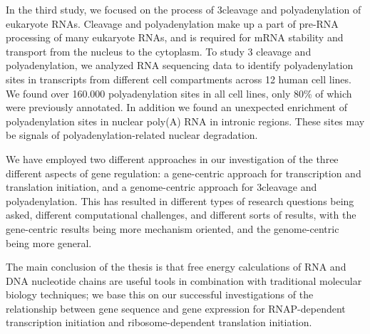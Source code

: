 In the third study, we focused on the process of 3\ppp cleavage and
polyadenylation of eukaryote RNAs. Cleavage and polyadenylation make up a part
of pre-RNA processing of many eukaryote RNAs, and is required for mRNA
stability and transport from the nucleus to the cytoplasm. To study 3\ppp
cleavage and polyadenylation, we analyzed RNA sequencing data to identify
polyadenylation sites in transcripts from different cell compartments across 12
human cell lines. We found over 160.000 polyadenylation sites in all cell
lines, only 80\% of which were previously annotated. In addition we found an
unexpected enrichment of polyadenylation sites in nuclear poly(A) RNA in
intronic regions. These sites may be signals of polyadenylation-related nuclear
degradation.

We have employed two different approaches in our investigation of the three
different aspects of gene regulation: a gene-centric approach for transcription
and translation initiation, and a genome-centric approach for 3\ppp cleavage
and polyadenylation. This has resulted in different types of research questions
being asked, different computational challenges, and different sorts of
results, with the gene-centric results being more mechanism oriented, and the
genome-centric being more general.

The main conclusion of the thesis is that free energy calculations of RNA and
DNA nucleotide chains are useful tools in combination with traditional
molecular biology techniques; we base this on our successful investigations of
the relationship between gene sequence and gene expression for RNAP-dependent
transcription initiation and ribosome-dependent translation initiation.
